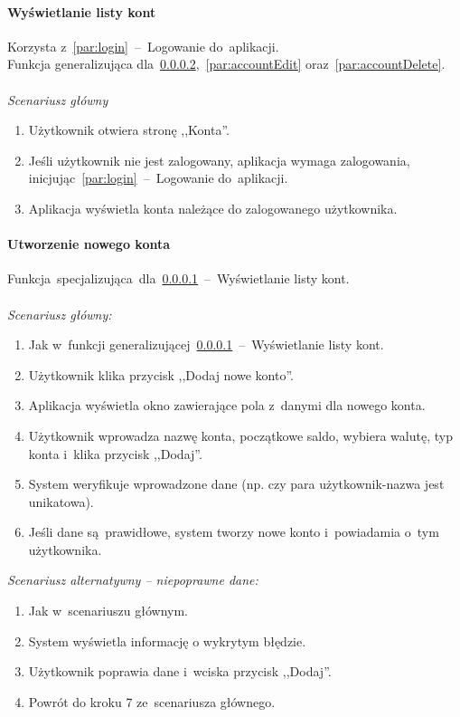 \paragraph{Wyświetlanie listy kont\newline}
\label{par:accountsView}
Korzysta z~\ref{par:login}~--~Logowanie do~aplikacji.\\
\indent Funkcja generalizująca dla~\ref{par:accountCreate},~\ref{par:accountEdit} oraz~\ref{par:accountDelete}.\\\\
\textit{Scenariusz główny}
\begin{enumerate}
  \item Użytkownik otwiera stronę ,,Konta''.
  \item Jeśli użytkownik nie jest zalogowany, aplikacja wymaga zalogowania, inicjując~\ref{par:login}~--~Logowanie do~aplikacji.
  \item Aplikacja wyświetla konta należące do zalogowanego użytkownika.
\end{enumerate}

\paragraph{Utworzenie nowego konta\newline}
\label{par:accountCreate}
Funkcja~specjalizująca~dla~\ref{par:accountsView}~--~Wyświetlanie listy kont.\\\\
\textit{Scenariusz główny:}
\begin{enumerate}
  \item[1-3.] Jak w~funkcji generalizującej~\ref{par:accountsView}~--~Wyświetlanie listy kont.
  \item[4.] Użytkownik klika przycisk ,,Dodaj nowe konto''.
  \item[5.] Aplikacja wyświetla okno zawierające pola z~danymi dla nowego konta.
  \item[6.] Użytkownik wprowadza nazwę konta, początkowe saldo, wybiera walutę, typ konta i~klika przycisk ,,Dodaj''.
  \item[7.] System weryfikuje wprowadzone dane (np. czy para użytkownik-nazwa jest unikatowa).
  \item[8.] Jeśli dane są~prawidłowe, system tworzy nowe konto i~powiadamia o~tym użytkownika.
\end{enumerate}
\textit{Scenariusz alternatywny -- niepoprawne dane:}
\begin{enumerate}
  \item[1-7.] Jak w~scenariuszu głównym.
  \item[8.] System wyświetla informację o wykrytym błędzie.
  \item[9.] Użytkownik poprawia dane i~wciska przycisk ,,Dodaj''.
  \item[10.] Powrót do kroku 7 ze~scenariusza głównego.
\end{enumerate}

